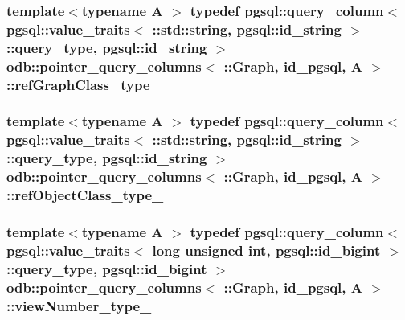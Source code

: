 \subsubsection[{ref\+Graph\+Class\+\_\+type\+\_\+}]{\setlength{\rightskip}{0pt plus 5cm}template$<$typename A $>$ typedef pgsql\+::query\+\_\+column$<$ pgsql\+::value\+\_\+traits$<$ \+::std\+::string, pgsql\+::id\+\_\+string $>$\+::query\+\_\+type, pgsql\+::id\+\_\+string $>$ odb\+::pointer\+\_\+query\+\_\+columns$<$ \+::{\bf Graph}, id\+\_\+pgsql, A $>$\+::{\bf ref\+Graph\+Class\+\_\+type\+\_\+}}\label{structodb_1_1pointer__query__columns_3_01_1_1_graph_00_01id__pgsql_00_01_a_01_4_a8a225606c1afca01500d85c3ce13373e}
\hypertarget{structodb_1_1pointer__query__columns_3_01_1_1_graph_00_01id__pgsql_00_01_a_01_4_aecdd17603790aef184886a67add4e165}{}
\subsubsection[{ref\+Object\+Class\+\_\+type\+\_\+}]{\setlength{\rightskip}{0pt plus 5cm}template$<$typename A $>$ typedef pgsql\+::query\+\_\+column$<$ pgsql\+::value\+\_\+traits$<$ \+::std\+::string, pgsql\+::id\+\_\+string $>$\+::query\+\_\+type, pgsql\+::id\+\_\+string $>$ odb\+::pointer\+\_\+query\+\_\+columns$<$ \+::{\bf Graph}, id\+\_\+pgsql, A $>$\+::{\bf ref\+Object\+Class\+\_\+type\+\_\+}}\label{structodb_1_1pointer__query__columns_3_01_1_1_graph_00_01id__pgsql_00_01_a_01_4_aecdd17603790aef184886a67add4e165}
\hypertarget{structodb_1_1pointer__query__columns_3_01_1_1_graph_00_01id__pgsql_00_01_a_01_4_a743751e03ccf0b484c4cc6a007ce1bfa}{}
\subsubsection[{view\+Number\+\_\+type\+\_\+}]{\setlength{\rightskip}{0pt plus 5cm}template$<$typename A $>$ typedef pgsql\+::query\+\_\+column$<$ pgsql\+::value\+\_\+traits$<$ long unsigned int, pgsql\+::id\+\_\+bigint $>$\+::query\+\_\+type, pgsql\+::id\+\_\+bigint $>$ odb\+::pointer\+\_\+query\+\_\+columns$<$ \+::{\bf Graph}, id\+\_\+pgsql, A $>$\+::{\bf view\+Number\+\_\+type\+\_\+}}\label{structodb_1_1pointer__query__columns_3_01_1_1_graph_00_01id__pgsql_00_01_a_01_4_a743751e03ccf0b484c4cc6a007ce1bfa}


